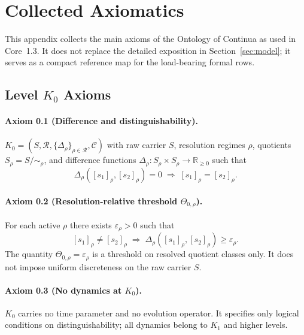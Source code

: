 
\section{Collected Axiomatics}
\label{app:axioms-full}

This appendix collects the main axioms of the Ontology of Continua as used in
Core~1.3. It does not replace the detailed exposition in
Section~\ref{sec:model}; it serves as a compact reference map for the
load-bearing formal rows.

\subsection{Level \texorpdfstring{$K_0$}{K0} Axioms}

\paragraph{Axiom 0.1 (Difference and distinguishability).}
\(K_0 = (S,\mathcal{R},\{\Delta_\rho\}_{\rho\in\mathcal{R}},\mathcal{C})\)
with raw carrier \(S\), resolution regimes \(\rho\), quotients
\(S_\rho=S/{\sim_\rho}\), and difference functions
\(\Delta_\rho:S_\rho\times S_\rho\to\mathbb{R}_{\ge 0}\) such that
\[
  \Delta_\rho([s_1]_\rho,[s_2]_\rho)=0
  \;\Rightarrow\;
  [s_1]_\rho=[s_2]_\rho.
\]

\paragraph{Axiom 0.2 (Resolution-relative threshold \texorpdfstring{\(\Theta_{0,\rho}\)}{\Theta_0,rho}).}
For each active \(\rho\) there exists \(\varepsilon_\rho>0\) such that
\[
  [s_1]_\rho\neq[s_2]_\rho
  \;\Rightarrow\;
  \Delta_\rho([s_1]_\rho,[s_2]_\rho)\ge\varepsilon_\rho.
\]
The quantity \(\Theta_{0,\rho}=\varepsilon_\rho\) is a threshold on resolved
quotient classes only. It does not impose uniform discreteness on the raw
carrier \(S\).

\paragraph{Axiom 0.3 (No dynamics at \texorpdfstring{\(K_0\)}{K_0}).}
\(K_0\) carries no time parameter and no evolution operator.  It specifies only
logical conditions on distinguishability; all dynamics belong to \(K_1\) and
higher levels.

